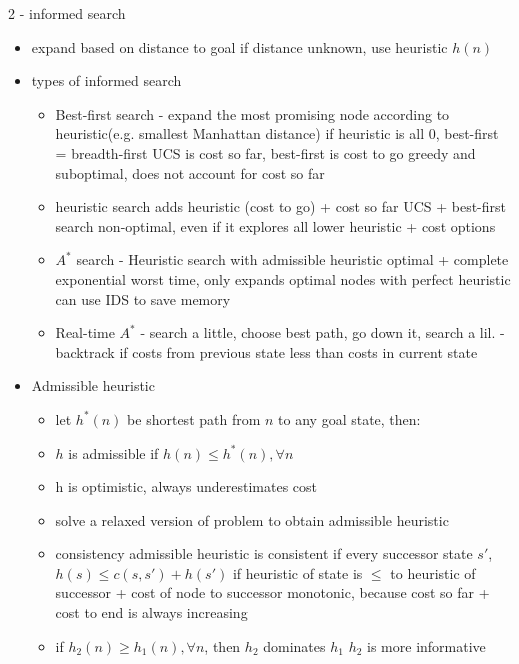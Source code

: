 \documentclass[11pt]{article}
\newcommand{\ee}[1]{\ensuremath{#1}}
\begin{document}
\begin{description}
\item 2 - informed search
\begin{itemize}
	\item expand based on distance to goal
	\subitem if distance unknown, use heuristic \ee{h(n)}
	\item types of informed search
	\begin{itemize}
		\item Best-first search - expand the most promising node according to heuristic(e.g. smallest Manhattan distance)
		\subitem if heuristic is all 0, best-first = breadth-first
		\subitem UCS is cost so far, best-first is cost to go
		\subitem greedy and suboptimal, does not account for cost so far 
		\item heuristic search
		\subitem adds heuristic (cost to go) + cost so far
		\subitem UCS + best-first search
		\subitem non-optimal, even if it explores all lower heuristic + cost options
		\item \ee{A^*} search - Heuristic search with admissible heuristic
		\subitem optimal + complete
		\subitem exponential worst time, only expands optimal nodes with perfect heuristic
		\subitem can use IDS to save memory
		\item Real-time \ee{A^*} - search a little, choose best path, go down it, search a lil.
		\subitem - backtrack if costs from previous state less than costs in current state
	\end{itemize}
	\item Admissible heuristic
	\begin{itemize}
		\item let \ee{h^*(n)} be shortest path from \ee{n} to any goal state, then:
		\item \ee{h} is admissible if \ee{h(n) \leq h^*(n), \forall n}
		\item h is optimistic, always underestimates cost
		\item solve a relaxed version of problem to obtain admissible heuristic
		\item consistency
		\subitem admissible heuristic is consistent if every successor state \ee{s'}, \ee{h(s) \leq c(s, s') + h(s')}
		\subitem if heuristic of state is \ee{\leq} to heuristic of successor + cost of node to successor
		\subitem monotonic, because cost so far + cost to end is always increasing
		\item if \ee{h_2(n) \geq h_1(n), \forall n}, then \ee{h_2} dominates \ee{h_1}
		\subitem \ee{h_2} is more informative
	\end{itemize}


\end{itemize}
\end{description}
\end{document}
